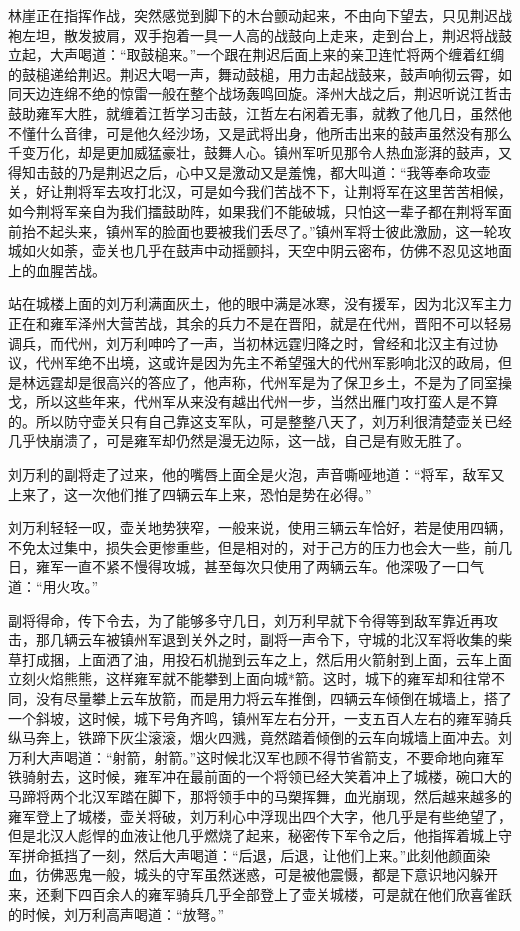 林崖正在指挥作战，突然感觉到脚下的木台颤动起来，不由向下望去，只见荆迟战袍左坦，散发披肩，双手抱着一具一人高的战鼓向上走来，走到台上，荆迟将战鼓立起，大声喝道：“取鼓槌来。”一个跟在荆迟后面上来的亲卫连忙将两个缠着红绸的鼓槌递给荆迟。荆迟大喝一声，舞动鼓槌，用力击起战鼓来，鼓声响彻云霄，如同天边连绵不绝的惊雷一般在整个战场轰鸣回旋。泽州大战之后，荆迟听说江哲击鼓助雍军大胜，就缠着江哲学习击鼓，江哲左右闲着无事，就教了他几日，虽然他不懂什么音律，可是他久经沙场，又是武将出身，他所击出来的鼓声虽然没有那么千变万化，却是更加威猛豪壮，鼓舞人心。镇州军听见那令人热血澎湃的鼓声，又得知击鼓的乃是荆迟之后，心中又是激动又是羞愧，都大叫道：“我等奉命攻壶关，好让荆将军去攻打北汉，可是如今我们苦战不下，让荆将军在这里苦苦相候，如今荆将军亲自为我们擂鼓助阵，如果我们不能破城，只怕这一辈子都在荆将军面前抬不起头来，镇州军的脸面也要被我们丢尽了。”镇州军将士彼此激励，这一轮攻城如火如荼，壶关也几乎在鼓声中动摇颤抖，天空中阴云密布，仿佛不忍见这地面上的血腥苦战。

站在城楼上面的刘万利满面灰土，他的眼中满是冰寒，没有援军，因为北汉军主力正在和雍军泽州大营苦战，其余的兵力不是在晋阳，就是在代州，晋阳不可以轻易调兵，而代州，刘万利呻吟了一声，当初林远霆归降之时，曾经和北汉主有过协议，代州军绝不出境，这或许是因为先主不希望强大的代州军影响北汉的政局，但是林远霆却是很高兴的答应了，他声称，代州军是为了保卫乡土，不是为了同室操戈，所以这些年来，代州军从来没有越出代州一步，当然出雁门攻打蛮人是不算的。所以防守壶关只有自己靠这支军队，可是整整八天了，刘万利很清楚壶关已经几乎快崩溃了，可是雍军却仍然是漫无边际，这一战，自己是有败无胜了。

刘万利的副将走了过来，他的嘴唇上面全是火泡，声音嘶哑地道：“将军，敌军又上来了，这一次他们推了四辆云车上来，恐怕是势在必得。”

刘万利轻轻一叹，壶关地势狭窄，一般来说，使用三辆云车恰好，若是使用四辆，不免太过集中，损失会更惨重些，但是相对的，对于己方的压力也会大一些，前几日，雍军一直不紧不慢得攻城，甚至每次只使用了两辆云车。他深吸了一口气道：“用火攻。”

副将得命，传下令去，为了能够多守几日，刘万利早就下令得等到敌军靠近再攻击，那几辆云车被镇州军退到关外之时，副将一声令下，守城的北汉军将收集的柴草打成捆，上面洒了油，用投石机抛到云车之上，然后用火箭射到上面，云车上面立刻火焰熊熊，这样雍军就不能攀到上面向城*箭。这时，城下的雍军却和往常不同，没有尽量攀上云车放箭，而是用力将云车推倒，四辆云车倾倒在城墙上，搭了一个斜坡，这时候，城下号角齐鸣，镇州军左右分开，一支五百人左右的雍军骑兵纵马奔上，铁蹄下灰尘滚滚，烟火四溅，竟然踏着倾倒的云车向城墙上面冲去。刘万利大声喝道：“射箭，射箭。”这时候北汉军也顾不得节省箭支，不要命地向雍军铁骑射去，这时候，雍军冲在最前面的一个将领已经大笑着冲上了城楼，碗口大的马蹄将两个北汉军踏在脚下，那将领手中的马槊挥舞，血光崩现，然后越来越多的雍军登上了城楼，壶关将破，刘万利心中浮现出四个大字，他几乎是有些绝望了，但是北汉人彪悍的血液让他几乎燃烧了起来，秘密传下军令之后，他指挥着城上守军拼命抵挡了一刻，然后大声喝道：“后退，后退，让他们上来。”此刻他颜面染血，彷佛恶鬼一般，城头的守军虽然迷惑，可是被他震慑，都是下意识地闪躲开来，还剩下四百余人的雍军骑兵几乎全部登上了壶关城楼，可是就在他们欣喜雀跃的时候，刘万利高声喝道：“放弩。”

